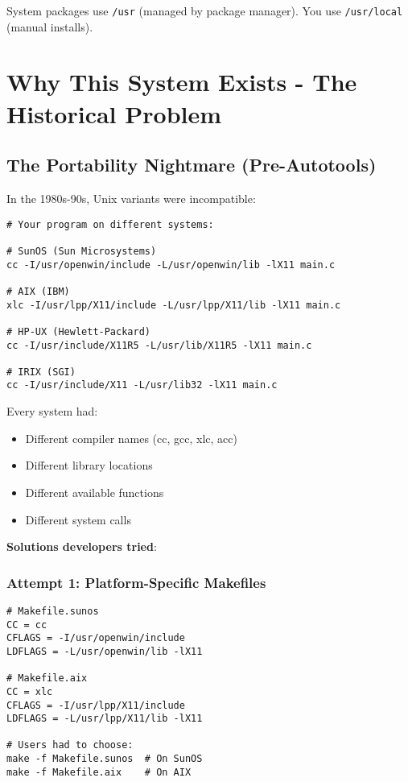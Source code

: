 System packages use \texttt{/usr} (managed by package manager). You use \texttt{/usr/local} (manual installs).

\section{Why This System Exists - The Historical Problem}

\subsection{The Portability Nightmare (Pre-Autotools)}

In the 1980s-90s, Unix variants were incompatible:

\begin{lstlisting}
# Your program on different systems:

# SunOS (Sun Microsystems)
cc -I/usr/openwin/include -L/usr/openwin/lib -lX11 main.c

# AIX (IBM)
xlc -I/usr/lpp/X11/include -L/usr/lpp/X11/lib -lX11 main.c

# HP-UX (Hewlett-Packard)
cc -I/usr/include/X11R5 -L/usr/lib/X11R5 -lX11 main.c

# IRIX (SGI)
cc -I/usr/include/X11 -L/usr/lib32 -lX11 main.c
\end{lstlisting}

Every system had:
\begin{itemize}
    \item Different compiler names (cc, gcc, xlc, acc)
    \item Different library locations
    \item Different available functions
    \item Different system calls
\end{itemize}

\textbf{Solutions developers tried}:

\subsubsection{Attempt 1: Platform-Specific Makefiles}

\begin{lstlisting}
# Makefile.sunos
CC = cc
CFLAGS = -I/usr/openwin/include
LDFLAGS = -L/usr/openwin/lib -lX11

# Makefile.aix
CC = xlc
CFLAGS = -I/usr/lpp/X11/include
LDFLAGS = -L/usr/lpp/X11/lib -lX11

# Users had to choose:
make -f Makefile.sunos  # On SunOS
make -f Makefile.aix    # On AIX
\end{lstlisting}

